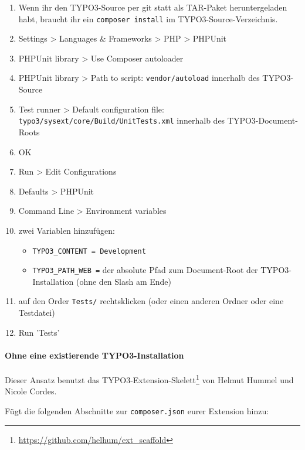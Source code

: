\documentclass[a4paper,11pt,headsepline]{scrartcl}
\begin{document}
\begin{enumerate}
  \item Wenn ihr den TYPO3-Source per git statt als TAR-Paket heruntergeladen habt, braucht ihr ein \texttt{composer install} im TYPO3-Source-Verzeichnis.
  \item Settings > Languages \& Frameworks > PHP > PHPUnit
  \item PHPUnit library > Use Composer autoloader
  \item PHPUnit library > Path to script: \texttt{vendor/autoload} innerhalb des TYPO3-Source
  \item Test runner > Default configuration file: \texttt{typo3/sysext/core/Build/UnitTests.xml} innerhalb des TYPO3-Document-Roots
  \item OK
  \item Run > Edit Configurations
  \item Defaults > PHPUnit
  \item Command Line > Environment variables
  \item zwei Variablen hinzufügen:
    \begin{itemize}
      \item \texttt{TYPO3\_CONTENT = Development}
      \item \texttt{TYPO3\_PATH\_WEB =} der absolute Pfad zum Document-Root der TYPO3-Installation (ohne den Slash am Ende)
    \end{itemize}
  \item auf den Order \texttt{Tests/} rechtsklicken (oder einen anderen Ordner oder eine Testdatei)
  \item Run 'Tests'
\end{enumerate}


\paragraph{Ohne eine existierende TYPO3-Installation}

Dieser Ansatz benutzt das TYPO3-Extension-Skelett\footnote{\url{https://github.com/helhum/ext_scaffold}} von Helmut Hummel und Nicole Cordes.

Fügt die folgenden Abschnitte zur \texttt{composer.json} eurer Extension hinzu:

\small
{}
\normalsize
\end{document}
